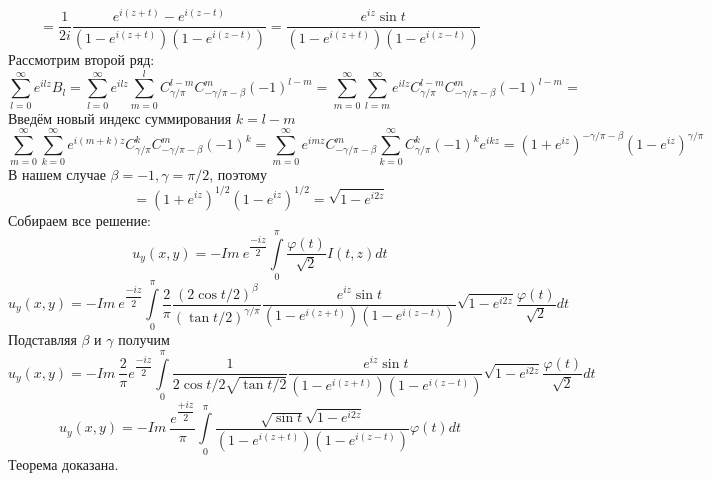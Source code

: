 \documentclass[9pt]{article}
\begin{document}
		\begin{equation*}
			= \dfrac{1}{2i}  \dfrac{e^{i(z+t)} - e^{i(z-t)}}{\left(1 - e^{i(z+t)} \right) \left(1 - e^{i(z-t)}\right)} =  \dfrac{e^{iz} \sin{t}}{\left(1 - e^{i(z+t)} \right) \left(1 - e^{i(z-t)}\right)}
		\end{equation*}
		Рассмотрим второй ряд:
		\begin{equation*}
			\sum\limits_{l =0 }^{\infty} e^{ilz} B_{l} = \sum\limits_{l =0 }^{\infty} e^{ilz} \sum\limits_{m=0}^{l} C^{l - m}_{\gamma/\pi} C^{m}_{-\gamma/\pi - \beta} (-1)^{l-m} = \sum\limits_{m=0}^{\infty} \sum\limits_{l=m}^{\infty} e^{ilz} C^{l - m}_{\gamma/\pi} C^{m}_{-\gamma/\pi - \beta} (-1)^{l-m} = 
		\end{equation*}
		Введём новый индекс суммирования $k = l -m$
		\begin{equation*}
			\sum\limits_{m=0}^{\infty} \sum\limits_{k=0}^{\infty} e^{i(m+k)z} C^{k}_{\gamma/\pi} C^{m}_{-\gamma/\pi - \beta} (-1)^{k} = \sum\limits_{m=0}^{\infty} e^{imz} C^{m}_{-\gamma/\pi - \beta} \sum\limits_{k=0}^{\infty}  C^{k}_{\gamma/\pi} (-1)^k e^{ikz} = (1 + e^{iz})^{-\gamma/\pi - \beta} (1- e^{iz})^{\gamma/\pi} 
		\end{equation*}
		В нашем случае $\beta = -1, \gamma = \pi/2$, поэтому
		\begin{equation*}
			= (1 + e^{iz})^{1/2} (1- e^{iz})^{1/2} =\sqrt{1 - e^{i2z}} 
		\end{equation*}
		Собираем все решение:
		\begin{equation*}
			u_y(x,y) = - Im\ e^{\dfrac{-iz}{2}} \int\limits_0^\pi \dfrac{\varphi(t)}{\sqrt2} I(t,z) dt 
		\end{equation*}
		\begin{equation*}
			u_y(x,y) = - Im\ e^{\dfrac{-iz}{2}} \int\limits_0^\pi \dfrac{2}{\pi}\dfrac{(2\cos{t/2})^\beta}{(\tan{t/2})^{\gamma/\pi}}  \dfrac{e^{iz} \sin{t}}{\left(1 - e^{i(z+t)} \right) \left(1 - e^{i(z-t)}\right)} \sqrt{1 - e^{i2z}} \dfrac{\varphi(t)}{\sqrt2} dt
		\end{equation*}
		Подставляя $\beta$ и $\gamma$ получим
		\begin{equation*}
			u_y(x,y) = - Im\  \dfrac{2}{\pi} e^{\dfrac{-iz}{2}} \int\limits_0^\pi \dfrac{1}{2\cos{t/2} \sqrt{\tan{t/2}}}  \dfrac{e^{iz} \sin{t}}{\left(1 - e^{i(z+t)} \right) \left(1 - e^{i(z-t)}\right)} \sqrt{1 - e^{i2z}} \dfrac{\varphi(t)}{\sqrt2} dt
		\end{equation*}
		\begin{equation*}
			u_y(x,y) = - Im\  \dfrac{e^{\dfrac{+iz}{2}}}{\pi}  \int\limits_0^\pi  \dfrac{\sqrt{\sin{t}} \sqrt{1 - e^{i2z}}}{\left(1 - e^{i(z+t)} \right) \left(1 - e^{i(z-t)}\right)}  \varphi(t) dt
		\end{equation*}
		Теорема доказана.
\end{document}
